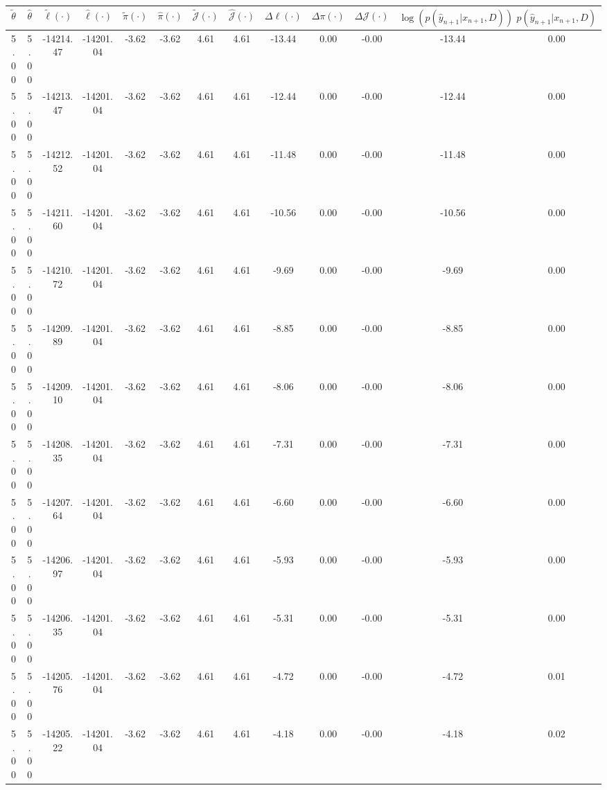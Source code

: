 \begin{table}[htbp]
        \centering
        \tiny
        \begin{adjustbox}{angle=90}
            \begin{tabular}{|c|c|c|c|c|c|c|c|c|c|c|c|c|}
                \hline
                 $\tilde{\theta}$ & $\hat{\theta}$ & $\tilde{\ell}(\cdot)$ & $\hat{\ell}(\cdot)$ & $\tilde{\pi}(\cdot)$ & $\hat{\pi}(\cdot)$ & $\tilde{\mathcal{J}}(\cdot)$ & $\hat{\mathcal{J}}(\cdot)$ & $\Delta \ell(\cdot)$ & $\Delta \pi(\cdot)$ & $\Delta \mathcal{J}(\cdot)$ & $\log(p(\hat{y}_{n+1}|x_{n+1}, D))$ & $p(\hat{y}_{n+1}|x_{n+1}, D)$ \\
                \hline
                 5.00 & 5.00 & -14214.47 & -14201.04 & -3.62 & -3.62 & 4.61 & 4.61 & -13.44 & 0.00 & -0.00 & -13.44 & 0.00\\ \hline
 5.00 & 5.00 & -14213.47 & -14201.04 & -3.62 & -3.62 & 4.61 & 4.61 & -12.44 & 0.00 & -0.00 & -12.44 & 0.00\\ \hline
 5.00 & 5.00 & -14212.52 & -14201.04 & -3.62 & -3.62 & 4.61 & 4.61 & -11.48 & 0.00 & -0.00 & -11.48 & 0.00\\ \hline
 5.00 & 5.00 & -14211.60 & -14201.04 & -3.62 & -3.62 & 4.61 & 4.61 & -10.56 & 0.00 & -0.00 & -10.56 & 0.00\\ \hline
 5.00 & 5.00 & -14210.72 & -14201.04 & -3.62 & -3.62 & 4.61 & 4.61 & -9.69 & 0.00 & -0.00 & -9.69 & 0.00\\ \hline
 5.00 & 5.00 & -14209.89 & -14201.04 & -3.62 & -3.62 & 4.61 & 4.61 & -8.85 & 0.00 & -0.00 & -8.85 & 0.00\\ \hline
 5.00 & 5.00 & -14209.10 & -14201.04 & -3.62 & -3.62 & 4.61 & 4.61 & -8.06 & 0.00 & -0.00 & -8.06 & 0.00\\ \hline
 5.00 & 5.00 & -14208.35 & -14201.04 & -3.62 & -3.62 & 4.61 & 4.61 & -7.31 & 0.00 & -0.00 & -7.31 & 0.00\\ \hline
 5.00 & 5.00 & -14207.64 & -14201.04 & -3.62 & -3.62 & 4.61 & 4.61 & -6.60 & 0.00 & -0.00 & -6.60 & 0.00\\ \hline
 5.00 & 5.00 & -14206.97 & -14201.04 & -3.62 & -3.62 & 4.61 & 4.61 & -5.93 & 0.00 & -0.00 & -5.93 & 0.00\\ \hline
 5.00 & 5.00 & -14206.35 & -14201.04 & -3.62 & -3.62 & 4.61 & 4.61 & -5.31 & 0.00 & -0.00 & -5.31 & 0.00\\ \hline
 5.00 & 5.00 & -14205.76 & -14201.04 & -3.62 & -3.62 & 4.61 & 4.61 & -4.72 & 0.00 & -0.00 & -4.72 & 0.01\\ \hline
 5.00 & 5.00 & -14205.22 & -14201.04 & -3.62 & -3.62 & 4.61 & 4.61 & -4.18 & 0.00 & -0.00 & -4.18 & 0.02\\ \hline

\end{tabular}
\end{adjustbox}
\end{table}
